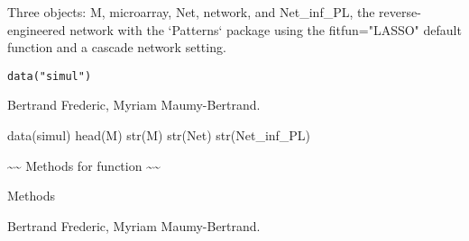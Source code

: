 \documentclass[a4paper]{book}
\begin{document}
%
\begin{Description}\relax
Three objects: M, microarray, Net, network, and Net\_inf\_PL, the reverse-engineered network with the `Patterns` package using the fitfun="LASSO" default function and a cascade network setting.
\end{Description}
%
\begin{Usage}
\begin{verbatim}
data("simul")
\end{verbatim}
\end{Usage}
%
\begin{Author}\relax
Bertrand Frederic, Myriam Maumy-Bertrand.
\end{Author}
%
\begin{Examples}
\begin{ExampleCode}
data(simul)
head(M)
str(M)
str(Net)
str(Net_inf_PL)
\end{ExampleCode}
\end{Examples}
%
\begin{Description}\relax
\textasciitilde{}\textasciitilde{} Methods for function   \textasciitilde{}\textasciitilde{}
\end{Description}
%
\begin{Section}{Methods}
\begin{description}


\item[] 



\item[] 



\end{description}
\end{Section}
%
\begin{Author}\relax
Bertrand Frederic, Myriam Maumy-Bertrand.
\end{Author}
\end{document}
